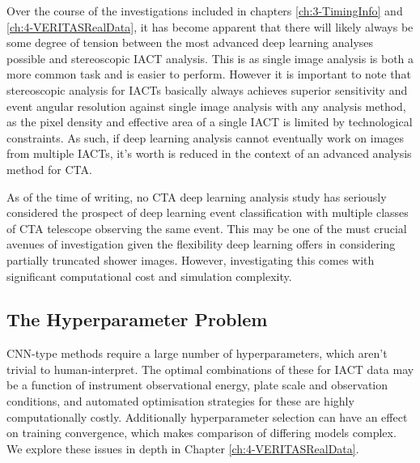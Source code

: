 Over the course of the investigations included in chapters \ref{ch:3-TimingInfo} and \ref{ch:4-VERITASRealData}, it has become apparent that there will likely always be some degree of tension between the most advanced deep learning analyses possible and stereoscopic IACT analysis. This is as single image analysis is both a more common task and is easier to perform.  However it is important to note that stereoscopic analysis for IACTs basically always achieves superior sensitivity and event angular resolution against single image analysis with any analysis method, as the pixel density and effective area of a single IACT is limited by technological constraints. As such, if deep learning analysis cannot eventually work on images from multiple IACTs, it's worth is reduced in the context of an advanced analysis method for CTA.

As of the time of writing, no CTA deep learning analysis study has seriously considered the prospect of deep learning event classification with multiple classes of CTA telescope observing the same event. This may be one of the must crucial avenues of investigation given the flexibility deep learning offers in considering partially truncated shower images. However, investigating this comes with significant computational cost and simulation complexity.

\subsection{The Hyperparameter Problem}
CNN-type methods require a large number of hyperparameters, which aren't trivial to human-interpret. The optimal combinations of these for IACT data may be a function of instrument observational energy, plate scale and observation conditions, and automated optimisation strategies for these are highly computationally costly. Additionally hyperparameter selection can have an effect on training convergence, which makes comparison of differing models complex. We explore these issues in depth in Chapter \ref{ch:4-VERITASRealData}.

